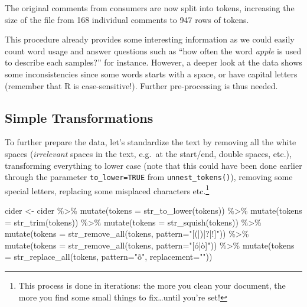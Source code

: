 \documentclass[
]{krantz}
\makeatletter
\newenvironment{Shaded}{\begin{snugshade}}{\end{snugshade}}
\newcommand{\AttributeTok}[1]{\textcolor[rgb]{0.61,0.61,0.61}{#1}}
\newcommand{\FunctionTok}[1]{\textcolor[rgb]{0,0,0}{#1}}
\newcommand{\NormalTok}[1]{#1}
\newcommand{\OtherTok}[1]{\textcolor[rgb]{0.37,0.37,0.37}{#1}}
\newcommand{\SpecialCharTok}[1]{\textcolor[rgb]{0,0,0}{#1}}
\newcommand{\StringTok}[1]{\textcolor[rgb]{0.5,0.5,0.5}{#1}}
\newenvironment{kframe}{%
\medskip{}
\setlength{\fboxsep}{.8em}
 \def\at@end@of@kframe{}%
 \ifinner\ifhmode%
  \def\at@end@of@kframe{\end{minipage}}%
  \begin{minipage}{\columnwidth}%
 \fi\fi%
 \def\FrameCommand##1{\hskip\@totalleftmargin \hskip-\fboxsep
 \colorbox{shadecolor}{##1}\hskip-\fboxsep
     \hskip-\linewidth \hskip-\@totalleftmargin \hskip\columnwidth}%
 \MakeFramed {\advance\hsize-\width
   \@totalleftmargin\z@ \linewidth\hsize
   \@setminipage}}%
 {\par\unskip\endMakeFramed%
 \at@end@of@kframe}
\renewenvironment{Shaded}{\begin{kframe}}{\end{kframe}}
\makeatother
\begin{document}
The original comments from consumers are now split into tokens, increasing the size of the file from 168 individual comments to 947 rows of tokens.

This procedure already provides some interesting information as we could easily count word usage and answer questions such as ``how often the word \emph{apple} is used to describe each samples?'' for instance. However, a deeper look at the data shows some inconsistencies since some words starts with a space, or have capital letters (remember that R is case-sensitive!). Further pre-processing is thus needed.

\hypertarget{simple-transformations}{%
\subsection{Simple Transformations}\label{simple-transformations}}

To further prepare the data, let's standardize the text by removing all the white spaces (\emph{irrelevant} spaces in the text, e.g.~at the start/end, double spaces, etc.), transforming everything to lower case (note that this could have been done earlier through the parameter \texttt{to\_lower=TRUE} from \texttt{unnest\_tokens()}), removing some special letters, replacing some misplaced characters etc.\footnote{This process is done in iterations: the more you clean your document, the more you find some small things to fix\ldots until you're set!}

\begin{Shaded}
\begin{Highlighting}[]
\NormalTok{cider }\OtherTok{\textless{}{-}}\NormalTok{ cider }\SpecialCharTok{\%\textgreater{}\%} 
  \FunctionTok{mutate}\NormalTok{(}\AttributeTok{tokens =} \FunctionTok{str\_to\_lower}\NormalTok{(tokens)) }\SpecialCharTok{\%\textgreater{}\%} 
  \FunctionTok{mutate}\NormalTok{(}\AttributeTok{tokens =} \FunctionTok{str\_trim}\NormalTok{(tokens)) }\SpecialCharTok{\%\textgreater{}\%} 
  \FunctionTok{mutate}\NormalTok{(}\AttributeTok{tokens =} \FunctionTok{str\_squish}\NormalTok{(tokens)) }\SpecialCharTok{\%\textgreater{}\%} 
  \FunctionTok{mutate}\NormalTok{(}\AttributeTok{tokens =} \FunctionTok{str\_remove\_all}\NormalTok{(tokens, }\AttributeTok{pattern=}\StringTok{"[(|)|?|!]"}\NormalTok{)) }\SpecialCharTok{\%\textgreater{}\%} 
  \FunctionTok{mutate}\NormalTok{(}\AttributeTok{tokens =} \FunctionTok{str\_remove\_all}\NormalTok{(tokens, }\AttributeTok{pattern=}\StringTok{"[ó|ò]"}\NormalTok{)) }\SpecialCharTok{\%\textgreater{}\%} 
  \FunctionTok{mutate}\NormalTok{(}\AttributeTok{tokens =} \FunctionTok{str\_replace\_all}\NormalTok{(tokens, }\AttributeTok{pattern=}\StringTok{"õ"}\NormalTok{, }\AttributeTok{replacement=}\StringTok{"\textquotesingle{}"}\NormalTok{))}
\end{Highlighting}
\end{Shaded}
\end{document}
